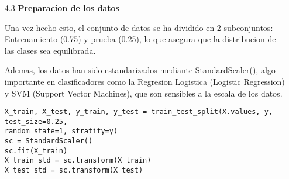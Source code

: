 \documentclass{article}
\begin{document}
\begin{itemize}

\item[4.3]  {\bf Preparacion de los datos}

Una vez hecho esto, el conjunto de datos se ha dividido en 2 subconjuntos: Entrenamiento (0.75) y prueba (0.25), lo que asegura que la distribucion de las clases sea equilibrada.

Ademas, los datos han sido estandarizados mediante StandardScaler(), algo importante en clasificadores como la Regresion Logistica (Logistic Regression) y SVM (Support Vector Machines), que son sensibles a la escala de los datos.

\begin{tcolorbox}[width=14cm]
\begin{scriptsize}
\begin{verbatim}
X_train, X_test, y_train, y_test = train_test_split(X.values, y, test_size=0.25,
random_state=1, stratify=y)
sc = StandardScaler()
sc.fit(X_train)
X_train_std = sc.transform(X_train)
X_test_std = sc.transform(X_test)
\end{verbatim}
\end{scriptsize}
\end{tcolorbox}

\end{itemize}

\newpage
\end{document}
